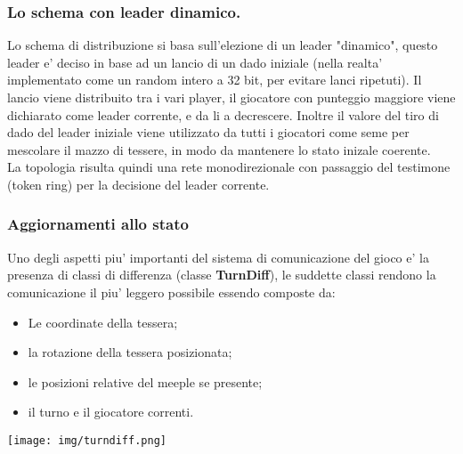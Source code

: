 \subsubsection{Lo schema con leader dinamico.}
Lo schema di distribuzione si basa sull'elezione di un leader "dinamico", questo
leader e' deciso in base ad un lancio di un dado iniziale (nella realta'
implementato come un random intero a 32 bit, per evitare lanci ripetuti). Il
lancio viene distribuito tra i vari player, 
il giocatore con punteggio maggiore viene
dichiarato come leader corrente, e da li a decrescere.
Inoltre il valore del tiro di dado del leader iniziale viene utilizzato da tutti i giocatori come seme per mescolare il mazzo di tessere, in modo da mantenere lo stato inizale coerente.\\
La topologia risulta quindi una rete monodirezionale con passaggio del
testimone (token ring) per la decisione del leader corrente.


\subsubsection{Aggiornamenti allo stato}
	Uno degli aspetti piu' importanti del sistema di comunicazione del gioco
	e' la presenza di classi di differenza (classe \textbf{TurnDiff}), le
	suddette classi rendono la comunicazione il piu' leggero possibile
	essendo composte da:\\

\begin{minipage}{.60\textwidth}
	\begin{itemize}
		\item Le coordinate della tessera;
		\item la rotazione della tessera posizionata;
		\item le posizioni relative del meeple se presente;
		\item il turno e il giocatore correnti.
	\end{itemize}
\end{minipage}
\begin{minipage}{.20\textwidth}
	\texttt{[image: img/turndiff.png]}
\end{minipage}

